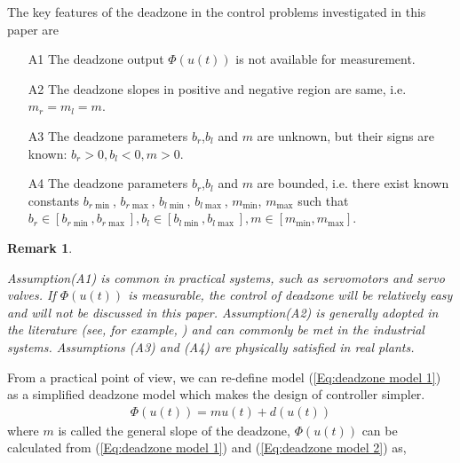 \documentclass[journal,onecolumn]{IEEEtran}
\newtheorem{rem}{Remark}
\begin{document}
The key features of the deadzone in the control problems
investigated in this paper are
\begin{enumerate}
\item[{\rm  A1}]The deadzone output $\Phi (u(t))$ is not available for
measurement.
\item[{\rm  A2}]The deadzone slopes in positive and negative region
are same, i.e. ${m_r} = {m_l} = m$.
\item[{\rm  A3}]The deadzone parameters $b_r$,$b_l$ and $m$ are unknown,
but their signs are known: ${b_r} > 0,{b_l} < 0,m > 0$.
\item[{\rm  A4}]The deadzone parameters $b_r$,$b_l$ and $m$ are bounded,
i.e. there exist known constants $b_{r\min }$, $b_{r\max }$,
$b_{l\min }$, $b_{l\max }$, $m_{\min }$, $m_{\max }$ such that${b_r}
\in [{b_{r\min }},{b_{r\max }}],{b_l} \in [{b_{l\min }},{b_{l\max
}}],m \in [{m_{\min }},{m_{\max }}]$.
\end{enumerate}


\begin{rem}\label{re1}


Assumption(A1) is common in practical systems, such as servomotors
and servo valves. If $\Phi (u(t))$ is measurable, the control of
deadzone will be relatively easy and will not be discussed in this
paper. Assumption(A2) is generally adopted in the literature (see,
for example, \cite{12,13}) and can commonly be met in the industrial
systems. Assumptions (A3) and (A4) are physically satisfied in real
plants.
\end{rem}

From a practical point of view, we can re-define model
(\ref{Eq:deadzone model 1}) as a simplified deadzone model\cite{4}
which makes the design of controller simpler\cite{xluo09}.
\begin{equation}
\label{Eq:deadzone model 2}
\begin{array}{rcl}
\Phi (u(t)) = mu(t) + d(u(t))
\end{array}
\end{equation}
where $ m $ is called the general slope of the deadzone, $\Phi
(u(t))$ can be calculated from (\ref{Eq:deadzone model 1}) and
(\ref{Eq:deadzone model 2}) as,
\end{document}
